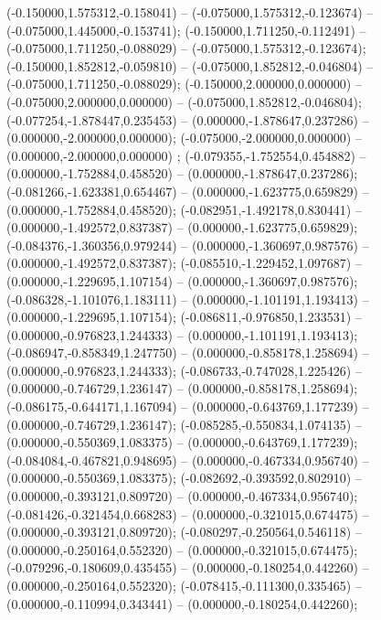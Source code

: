  (-0.150000,1.575312,-0.158041) -- (-0.075000,1.575312,-0.123674) -- (-0.075000,1.445000,-0.153741);
 (-0.150000,1.711250,-0.112491) -- (-0.075000,1.711250,-0.088029) -- (-0.075000,1.575312,-0.123674);
 (-0.150000,1.852812,-0.059810) -- (-0.075000,1.852812,-0.046804) -- (-0.075000,1.711250,-0.088029);
 (-0.150000,2.000000,0.000000) -- (-0.075000,2.000000,0.000000) -- (-0.075000,1.852812,-0.046804);
 (-0.077254,-1.878447,0.235453) -- (0.000000,-1.878647,0.237286) -- (0.000000,-2.000000,0.000000);
 (-0.075000,-2.000000,0.000000) -- (0.000000,-2.000000,0.000000) ;
 (-0.079355,-1.752554,0.454882) -- (0.000000,-1.752884,0.458520) -- (0.000000,-1.878647,0.237286);
 (-0.081266,-1.623381,0.654467) -- (0.000000,-1.623775,0.659829) -- (0.000000,-1.752884,0.458520);
 (-0.082951,-1.492178,0.830441) -- (0.000000,-1.492572,0.837387) -- (0.000000,-1.623775,0.659829);
 (-0.084376,-1.360356,0.979244) -- (0.000000,-1.360697,0.987576) -- (0.000000,-1.492572,0.837387);
 (-0.085510,-1.229452,1.097687) -- (0.000000,-1.229695,1.107154) -- (0.000000,-1.360697,0.987576);
 (-0.086328,-1.101076,1.183111) -- (0.000000,-1.101191,1.193413) -- (0.000000,-1.229695,1.107154);
 (-0.086811,-0.976850,1.233531) -- (0.000000,-0.976823,1.244333) -- (0.000000,-1.101191,1.193413);
 (-0.086947,-0.858349,1.247750) -- (0.000000,-0.858178,1.258694) -- (0.000000,-0.976823,1.244333);
 (-0.086733,-0.747028,1.225426) -- (0.000000,-0.746729,1.236147) -- (0.000000,-0.858178,1.258694);
 (-0.086175,-0.644171,1.167094) -- (0.000000,-0.643769,1.177239) -- (0.000000,-0.746729,1.236147);
 (-0.085285,-0.550834,1.074135) -- (0.000000,-0.550369,1.083375) -- (0.000000,-0.643769,1.177239);
 (-0.084084,-0.467821,0.948695) -- (0.000000,-0.467334,0.956740) -- (0.000000,-0.550369,1.083375);
 (-0.082692,-0.393592,0.802910) -- (0.000000,-0.393121,0.809720) -- (0.000000,-0.467334,0.956740);
 (-0.081426,-0.321454,0.668283) -- (0.000000,-0.321015,0.674475) -- (0.000000,-0.393121,0.809720);
 (-0.080297,-0.250564,0.546118) -- (0.000000,-0.250164,0.552320) -- (0.000000,-0.321015,0.674475);
 (-0.079296,-0.180609,0.435455) -- (0.000000,-0.180254,0.442260) -- (0.000000,-0.250164,0.552320);
 (-0.078415,-0.111300,0.335465) -- (0.000000,-0.110994,0.343441) -- (0.000000,-0.180254,0.442260);
